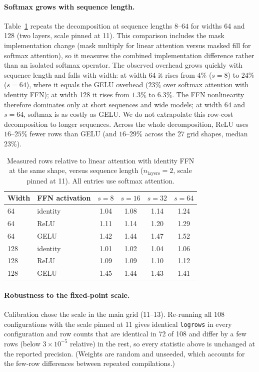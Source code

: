 \documentclass[10pt]{article}
\newcommand{\nlayers}{n_{\mathrm{layers}}}
\begin{document}
\paragraph{Softmax grows with sequence length.}
Table~\ref{tab:seqT} repeats the decomposition at sequence lengths $8$--$64$
for widths 64 and 128 (two layers, scale pinned at 11). This comparison
includes the mask implementation change (mask multiply for linear attention
versus masked fill for softmax attention), so it measures the combined
implementation difference rather than an isolated softmax operator. The observed overhead
grows quickly with sequence length and falls with width: at width 64 it rises
from $4\%$ ($s{=}8$) to $24\%$ ($s{=}64$), where it equals the GELU overhead
($23\%$ over softmax attention with identity FFN); at width 128 it rises from
$1.3\%$ to $6.3\%$. The FFN nonlinearity therefore dominates only at short
sequences and wide models; at width 64 and $s{=}64$, softmax is as costly as
GELU. We do not extrapolate this row-cost decomposition to longer sequences. Across the whole
decomposition, ReLU uses $16$--$25\%$ fewer rows than GELU (and $16$--$29\%$
across the 27 grid shapes, median $23\%$).

\begin{table}[t]
\centering
\caption{Measured rows relative to linear attention with identity FFN at the same
  shape, versus sequence length ($\nlayers{=}2$, scale pinned at 11). All
  entries use softmax attention.}
\label{tab:seqT}
\begin{tabular}{llcccc}
\toprule
Width & FFN activation & $s{=}8$ & $s{=}16$ & $s{=}32$ & $s{=}64$ \\
\midrule
64  & identity & 1.04 & 1.08 & 1.14 & 1.24 \\
64  & ReLU     & 1.11 & 1.14 & 1.20 & 1.29 \\
64  & GELU     & 1.42 & 1.44 & 1.47 & 1.52 \\
128 & identity & 1.01 & 1.02 & 1.04 & 1.06 \\
128 & ReLU     & 1.09 & 1.09 & 1.10 & 1.12 \\
128 & GELU     & 1.45 & 1.44 & 1.43 & 1.41 \\
\bottomrule
\end{tabular}
\end{table}

\paragraph{Robustness to the fixed-point scale.}
Calibration chose the scale in the main grid (11--13). Re-running all 108
configurations with the scale pinned at 11 gives identical \texttt{logrows} in
every configuration and row counts that are identical in 72 of 108 and differ by
a few rows (below $3\times10^{-5}$ relative) in the rest, so every statistic above is
unchanged at the reported precision. (Weights are random and unseeded, which
accounts for the few-row differences between repeated compilations.)
\end{document}
